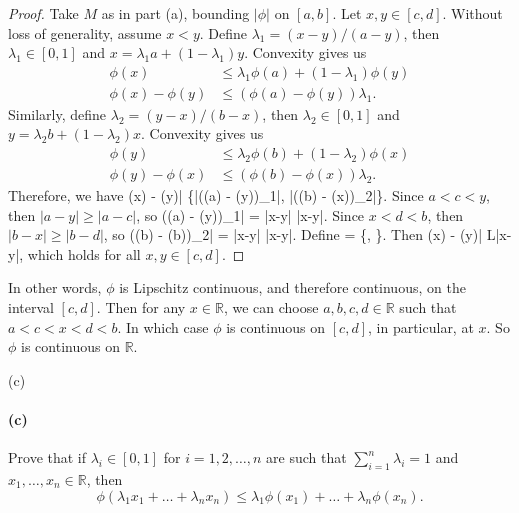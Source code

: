 \documentclass[12pt]{article}
\newenvironment{fullbox}{\begin{lrbox}{\savefullbox}\begin{minipage}{\dimexpr\textwidth-2\fboxsep\relax}}{\end{minipage}\end{lrbox}\begin{center}\framebox[\textwidth]{\usebox{\savefullbox}}\end{center}}
\newenvironment{pbox}[1][]{\begin{fullbox}\ifx#1\empty\else\paragraph{#1}\fi}{\end{fullbox}}
\theoremstyle{definition}
\newcommand{\R}{\mathbb{R}}
\def\[#1\]{\begin{align*}#1\end{align*}}
\begin{document}
\begin{proof}
    Take $M$ as in part (a), bounding $|\phi|$ on $[a,b]$. Let $x, y \in [c, d]$. Without loss of generality, assume $x < y$. Define $\lambda_1 = (x-y)/(a-y)$, then $\lambda_1 \in [0,1]$ and $x = \lambda_1 a + (1-\lambda_1)y$. Convexity gives us
    \begin{align*}
        \phi(x) &\leq \lambda_1\phi(a) + (1-\lambda_1)\phi(y) \\
        \phi(x) - \phi(y) &\leq (\phi(a) - \phi(y))\lambda_1.
    \end{align*}
    Similarly, define $\lambda_2 = (y-x)/(b-x)$, then $\lambda_2 \in [0, 1]$ and $y = \lambda_2 b + (1-\lambda_2)x$. Convexity gives us
    \begin{align*}
        \phi(y) &\leq \lambda_2\phi(b) + (1-\lambda_2)\phi(x) \\
        \phi(y) - \phi(x) &\leq (\phi(b) - \phi(x))\lambda_2.
    \end{align*}
    Therefore, we have
    \[
        |\phi(x) - \phi(y)| \leq \max\{|(\phi(a) - \phi(y))\lambda_1|, |(\phi(b) - \phi(x))\lambda_2|\}.
    \]
    Since $a < c < y$, then $|a-y| \geq |a-c|$, so
    \[
        |(\phi(a) - \phi(y))\lambda_1|
            =  |x-y|
            \leq {} |x-y|.
    \]
    Since $x < d < b$, then $|b-x| \geq |b-d|$, so
    \[
        |(\phi(b) - \phi(b))\lambda_2|
            =  |x-y|
            \leq {} |x-y|.
    \]
    Define
    \[
        L = \max\left\{,\; \right\}.
    \]
    Then
    \[
        |\phi(x) - \phi(y)| \leq L|x-y|,
    \]
    which holds for all $x, y \in [c,d]$.
    
\end{proof}

 In other words, $\phi$ is Lipschitz continuous, and therefore continuous, on the interval $[c,d]$. Then for any $x \in \R$, we can choose $a, b, c, d \in \R$ such that $a < c < x < d < b$. In which case $\phi$ is continuous on $[c,d]$, in particular, at $x$. So $\phi$ is continuous on $\R$.




\newpage
\begin{pbox}[(c)]
    Prove that if $\lambda_i \in [0,1]$ for $i=1,2,\dots,n$ are such that $\sum_{i=1}^n \lambda_i = 1$ and $x_1,\dots,x_n \in \mathbb{R}$, then 
    \begin{equation}
     \phi(\lambda_1 x_1 + \dots + \lambda_n x_n) \le \lambda_1 \phi(x_1) + \dots + \lambda_n \phi(x_n).
    \end{equation}
\end{pbox}
\end{document}

